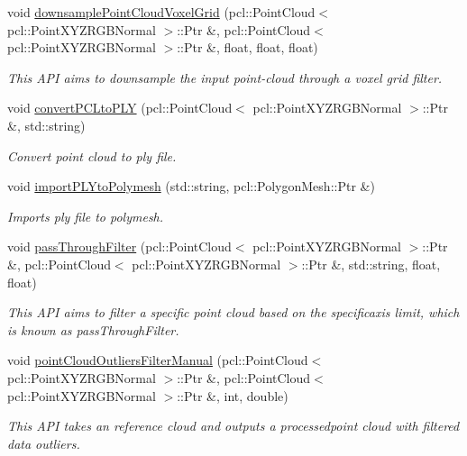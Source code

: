 \begin{DoxyCompactItemize}
void \hyperlink{classReconstruction_a82138f7b299c7047f53181b6abb70c81}{downsample\+Point\+Cloud\+Voxel\+Grid} (pcl\+::\+Point\+Cloud$<$ pcl\+::\+Point\+X\+Y\+Z\+R\+G\+B\+Normal $>$\+::Ptr \&, pcl\+::\+Point\+Cloud$<$ pcl\+::\+Point\+X\+Y\+Z\+R\+G\+B\+Normal $>$\+::Ptr \&, float, float, float)
\begin{DoxyCompactList}\small\item\em This A\+PI aims to downsample the input point-\/cloud through a voxel grid filter. \end{DoxyCompactList}\item 
void \hyperlink{classReconstruction_aad287c118ab81ecf00c29f55314fc237}{convert\+P\+C\+Lto\+P\+LY} (pcl\+::\+Point\+Cloud$<$ pcl\+::\+Point\+X\+Y\+Z\+R\+G\+B\+Normal $>$\+::Ptr \&, std\+::string)
\begin{DoxyCompactList}\small\item\em Convert point cloud to ply file. \end{DoxyCompactList}\item 
void \hyperlink{classReconstruction_ac2d96a55242b1849637da44e4e32f725}{import\+P\+L\+Yto\+Polymesh} (std\+::string, pcl\+::\+Polygon\+Mesh\+::\+Ptr \&)
\begin{DoxyCompactList}\small\item\em Imports ply file to polymesh. \end{DoxyCompactList}\item 
void \hyperlink{classReconstruction_aa2b56e19c016b8c32ff99e7c5bacb515}{pass\+Through\+Filter} (pcl\+::\+Point\+Cloud$<$ pcl\+::\+Point\+X\+Y\+Z\+R\+G\+B\+Normal $>$\+::Ptr \&, pcl\+::\+Point\+Cloud$<$ pcl\+::\+Point\+X\+Y\+Z\+R\+G\+B\+Normal $>$\+::Ptr \&, std\+::string, float, float)
\begin{DoxyCompactList}\small\item\em This A\+PI aims to filter a specific point cloud based on the specificaxis limit, which is known as pass\+Through\+Filter. \end{DoxyCompactList}\item 
void \hyperlink{classReconstruction_ac7cff09bc04f6579b54932df8eb9b6ab}{point\+Cloud\+Outliers\+Filter\+Manual} (pcl\+::\+Point\+Cloud$<$ pcl\+::\+Point\+X\+Y\+Z\+R\+G\+B\+Normal $>$\+::Ptr \&, pcl\+::\+Point\+Cloud$<$ pcl\+::\+Point\+X\+Y\+Z\+R\+G\+B\+Normal $>$\+::Ptr \&, int, double)
\begin{DoxyCompactList}\small\item\em This A\+PI takes an reference cloud and outputs a processedpoint cloud with filtered data outliers. \end{DoxyCompactList}\item 

\end{DoxyCompactItemize}

